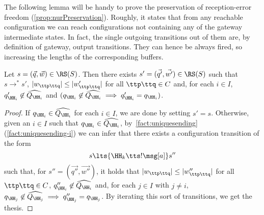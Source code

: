 The following lemma will be handy to prove the preservation of reception-error freedom (\cref{prop:nurPreservation}). Roughly, it states that from any reachable configuration we can reach
configurations not containing any of the gateway intermediate states. 
In fact, the single outgoing transitions out of them are, by definition of gateway, output transitions. They can hence be always fired, so increasing the lengths of the corresponding buffers.
\begin{lemma}
\label{lem:addendum}
Let $s = (\vec{q},\vec{w}) \in \RS(S)$. Then there exists $s'= (\vec{q'},\vec{w'}) \in \RS(S)$ such that $s \to^* s'$,
$|w_{\ttp\ttq}| \leq |w'_{\ttp\ttq}|$ for all $\ttp\ttq \in C$
and,  for each $i \in I$, $q'_{\HH_i}\not\in\widehat{Q_{\HH_i}}$ and
 $(q_{\HH_i}\not\in\widehat{Q_{\HH_i}} \implies q'_{\HH_i}= q_{\HH_i})$.
\end{lemma}
\begin{proof}
If ${q}_{\HH_i}\in\widehat{Q_{\HH_i}}$  for each $i\in I$, we are done by setting $s'=s$.
Otherwise, given an $i\in I$ such that  ${q}_{\HH_i}\in\widehat{Q_{\HH_i}}$, 
by~\cref{fact:uniquesending}(\ref{fact:uniquesending-i}) we can infer that there exists a configuration transition of the form
$$
s \lts{\HH_k\tts!\msg[a]} s''
$$
such that, for $s'' = (\vec{q''}, \vec{w''})$, it holds that 
$|w_{\ttp\ttq}| \leq |w''_{\ttp\ttq}|$ for all $\ttp\ttq \in C$,
$q''_{\HH_i}\not\in \widehat{Q_{\HH_i}}$ 
and, for each $j\in I$ with $j\neq i$, $q_{\HH_j}\not\in\widehat{Q_{\HH_j}} \implies q''_{\HH_j}= q_{\HH_j}$.
By iterating this sort of transitions, we get the thesis.
\end{proof}


















